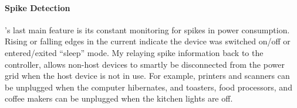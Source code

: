 \paragraph{Spike Detection} \netlet's last main feature is its constant monitoring for spikes in power consumption. Rising or falling edges in the current indicate the device was switched on/off or entered/exited ``sleep'' mode.  My relaying spike information back to the controller, \netlets allows non-host devices to smartly be disconnected from the power grid when the host  device is not in use.  For example, printers and scanners can be unplugged when the computer hibernates, and toasters, food processors, and coffee makers can be unplugged when the kitchen lights are off.




